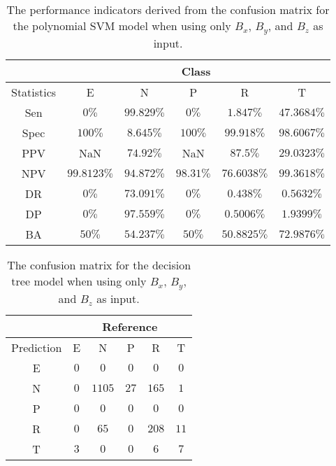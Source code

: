 \begin{table}[!ht]
	\centering
	\begin{tabular}{|c|c|c|c|c|c|}
		\hline
		 & \multicolumn{5}{c|}{Class} \\ \hline
		Statistics & E & N & P & R & T \\ \hline
		Sen & $0\%$ & $99.829\%$ & $0\%$ & $1.847\%$ & $47.3684\%$ \\ \hline
		Spec & $100\%$ & $8.645\%$ & $100\%$ & $99.918\%$ & $98.6067\%$ \\ \hline
		PPV & NaN & $74.92\%$ & NaN & $87.5\%$ & $29.0323\%$ \\ \hline
		NPV & $99.8123\%$ & $94.872\%$ & $98.31\%$ & $76.6038\%$ & $99.3618\%$ \\ \hline
		DR & $0\%$ & $73.091\%$ & $0\%$ & $0.438\%$ & $0.5632\%$ \\ \hline
		DP & $0\%$ & $97.559\%$ & $0\%$ & $0.5006\%$ & $1.9399\%$ \\ \hline
		BA & $50\%$ & $54.237\%$ & $50\%$ & $50.8825\%$ & $72.9876\%$ \\ \hline
	\end{tabular}
	\caption{The performance indicators derived from the confusion matrix for the polynomial SVM model when using only $B_{x}$, $B_{y}$, and $B_{z}$ as input.}
	\label{tab:cs:reverse:coord:svmPoly}
\end{table}

\begin{table}[!ht]
	\centering
	\begin{tabular}{|c|c|c|c|c|c|}
		\hline
		 & \multicolumn{5}{|c|}{Reference} \\ \hline
		 Prediction & E & N & P & R & T \\ \hline
		 E & $0$ & $0$ & $0$ & $0$ & $0$ \\ \hline
		 N & $0$ & $1105$ & $27$ & $165$ & $1$ \\ \hline
		 P & $0$ & $0$ & $0$ & $0$ & $0$ \\ \hline
		 R & $0$ & $65$ & $0$ & $208$ & $11$ \\ \hline
		 T & $3$ & $0$ & $0$ & $6$ & $7$ \\ \hline
	\end{tabular}
	\caption{The confusion matrix for the decision tree model when using only $B_{x}$, $B_{y}$, and $B_{z}$ as input.}
	\label{tab:cm:coord:C5.0}
\end{table}


